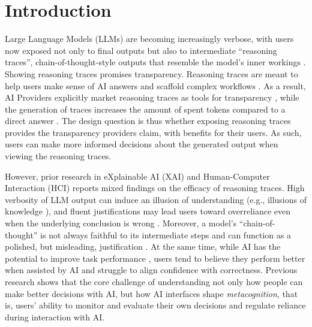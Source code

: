 \documentclass[manuscript, anonymous=false,authorversion,review=false]{acmart}
\begin{document}

\received{}
\received[revised]{ }
\received[accepted]{ }

\maketitle


\section{Introduction}
Large Language Models (LLMs) are becoming increasingly verbose, with users now exposed not only to final outputs but also to intermediate ``reasoning traces'', chain-of-thought-style outputs that resemble the model's inner workings \cite{barez2025chain}. Showing reasoning traces promises transparency. Reasoning traces are meant to help users make sense of AI answers and scaffold complex workflows \cite{6645235,anthropic2025extended,openai2024learning,openai2025monitorability}. As a result, AI Providers explicitly market reasoning traces as tools for transparency \cite{lindsey2025biology}, while the generation of traces increases the amount of spent tokens compared to a direct answer \cite{sui2025stop, anthropic2025extended}. The design question is thus whether exposing reasoning traces provides the transparency providers claim, with benefits for their users. As such, users can make more informed decisions about the generated output when viewing the reasoning traces.

However, prior research in eXplainable AI (XAI) and Human-Computer Interaction (HCI) reports mixed findings on the efficacy of reasoning traces. High verbosity of LLM output can induce an illusion of understanding (e.g., illusions of knowledge \cite{fisher2021harder}), and fluent justifications may lead users toward overreliance even when the underlying conclusion is wrong \cite{10.1145/3397481.3450639, 10.1145/3449287}. Moreover, a model's ``chain-of-thought'' is not always faithful to its intermediate steps and can function as a polished, but misleading, justification \cite{10.5555/3666122.3669397,lindsey2025biology, barez2025chain}. At the same time, while AI has the potential to improve task performance \cite{10.1145/3411764.3445717, steyvers_bayesian_2022,zulfikar_memoro_2024}, users tend to believe they perform better when assisted by AI \cite{FERNANDES2026108779, kloft2023ai, villa2023placebo, kosch2023placebo} and struggle to align confidence with correctness. Previous research shows that the core challenge of understanding not only how people can make better decisions with AI, but how AI interfaces shape \textit{metacognition}, that is, users' ability to monitor and evaluate their own decisions and regulate reliance during interaction with AI.%
\end{document}

